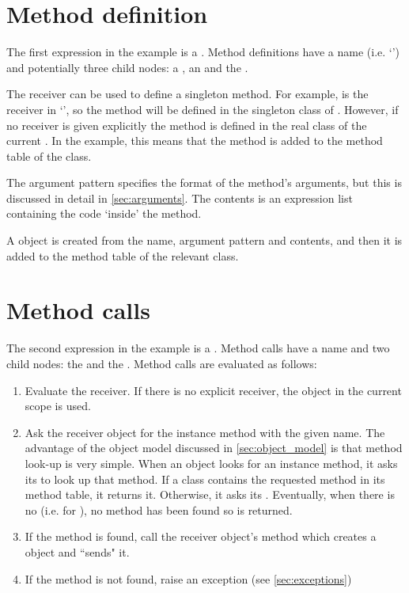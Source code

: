 \section{Method definition}

The first expression in the example is a . Method definitions have a name (i.e. `') and potentially three child nodes: a , an  and the .

The receiver can be used to define a singleton method. For example,  is the receiver in `', so the  method will be defined in the singleton class of . However, if no receiver is given explicitly the method is defined in the real class of the current . In the example, this means that the  method is added to the method table of the  class.

The argument pattern specifies the format of the method's arguments, but this is discussed in detail in \autoref{sec:arguments}. The contents is an expression list containing the code `inside' the method.

A  object is created from the name, argument pattern and contents, and then it is added to the method table of the relevant class.

\section{Method calls}

The second expression in the example is a . Method calls have a name and two child nodes: the  and the . Method calls are evaluated as follows:

\begin{enumerate}
  \item Evaluate the receiver. If there is no explicit receiver, the  object in the current scope is used.
  \item Ask the receiver object for the instance method with the given name. The advantage of the object model discussed in \autoref{sec:object_model} is that method look-up is very simple. When an object looks for an instance method, it asks its  to look up that method. If a class contains the requested method in its method table, it returns it. Otherwise, it asks its . Eventually, when there is no  (i.e. for ), no method has been found so  is returned.
  \item If the method is found, call the receiver object's  method which creates a  object and \linebreak ``sends" it.
  \item If the method is not found, raise an exception (see \autoref{sec:exceptions})
\end{enumerate}

